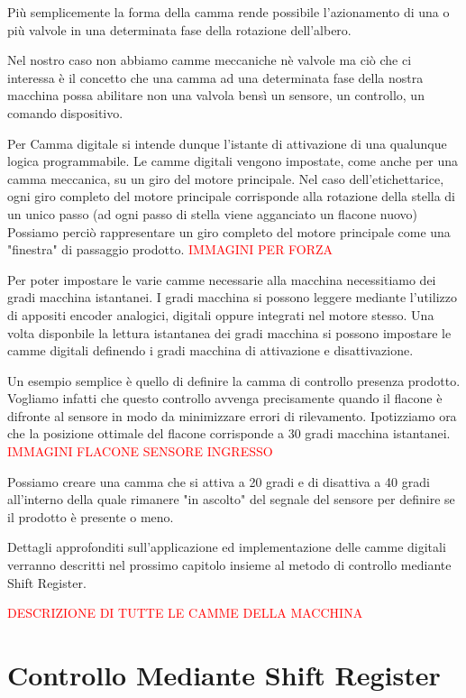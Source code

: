 \documentclass[12pt, a4paper, oneside]{book}
\begin{document}
Più semplicemente la forma della camma rende possibile l'azionamento di una o più valvole in una determinata fase della rotazione dell'albero. 

Nel nostro caso non abbiamo camme meccaniche nè valvole ma ciò che ci interessa è il concetto che una camma ad una determinata fase della nostra macchina possa abilitare non una valvola bensì un sensore, un controllo, un comando dispositivo.

Per Camma digitale si intende dunque l'istante di attivazione di una qualunque logica programmabile. Le camme digitali vengono impostate, come anche per una camma meccanica, su un giro del motore principale.
Nel caso dell'etichettarice, ogni giro completo del motore principale corrisponde alla rotazione della stella di un unico passo (ad ogni passo di stella viene agganciato un flacone nuovo)
Possiamo perciò rappresentare un giro completo del motore principale come una "finestra" di passaggio prodotto. \textcolor{red}{IMMAGINI PER FORZA}

Per poter impostare le varie camme necessarie alla macchina necessitiamo dei gradi macchina istantanei. I gradi macchina si possono leggere mediante l'utilizzo di appositi encoder analogici, digitali oppure integrati nel motore stesso.
Una volta disponbile la lettura istantanea dei gradi macchina si possono impostare le camme digitali definendo i gradi macchina di attivazione e disattivazione. 

Un esempio semplice è quello di definire la camma di controllo presenza prodotto. Vogliamo infatti che questo controllo avvenga precisamente quando il flacone è difronte al sensore in modo da minimizzare errori di rilevamento.
Ipotizziamo ora che la posizione ottimale del flacone corrisponde a 30 gradi macchina istantanei. 
\textcolor{red}{IMMAGINI FLACONE SENSORE INGRESSO}

Possiamo creare una camma che si attiva a 20 gradi e di disattiva a 40 gradi all'interno della quale rimanere "in ascolto" del segnale del sensore per definire se il prodotto è presente o meno.

Dettagli approfonditi sull'applicazione ed implementazione delle camme digitali verranno descritti nel prossimo capitolo insieme al metodo di controllo mediante Shift Register. 

\textcolor{red}{DESCRIZIONE DI TUTTE LE CAMME DELLA MACCHINA}






\section{Controllo Mediante Shift Register}
\end{document}
